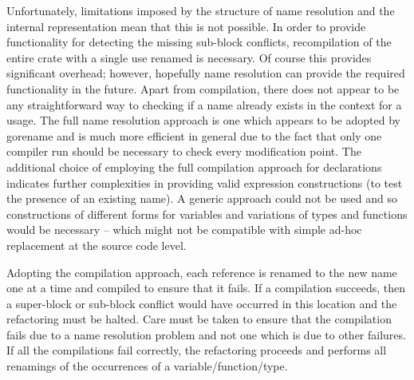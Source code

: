 Unfortunately, limitations imposed by the structure of name resolution and the internal representation mean that this is not possible. In order to provide functionality for detecting the missing sub-block conflicts, recompilation of the entire crate with a single use renamed is necessary. Of course this provides significant overhead; however, hopefully name resolution can provide the required functionality in the future. Apart from compilation, there does not appear to be any straightforward way to checking if a name already exists in the context for a usage. The full name resolution approach is one which appears to be adopted by gorename \cite{gorename15} and is much more efficient in general due to the fact that only one compiler run should be necessary to check every modification point. The additional choice of employing the full compilation approach for declarations indicates further complexities in providing valid expression constructions (to test the presence of an existing name). A generic approach could not be used and so constructions of different forms for variables and variations of types and functions would be necessary -- which might not be compatible with simple ad-hoc replacement at the source code level.

Adopting the compilation approach, each reference is renamed to the new name one at a time and compiled to ensure that it fails. If a compilation succeeds, then a super-block or sub-block conflict would have occurred in this location and the refactoring must be halted. Care must be taken to ensure that the compilation fails due to a name resolution problem and not one which is due to other failures. If all the compilations fail correctly, the refactoring proceeds and performs all renamings of the occurrences of a variable/function/type.


